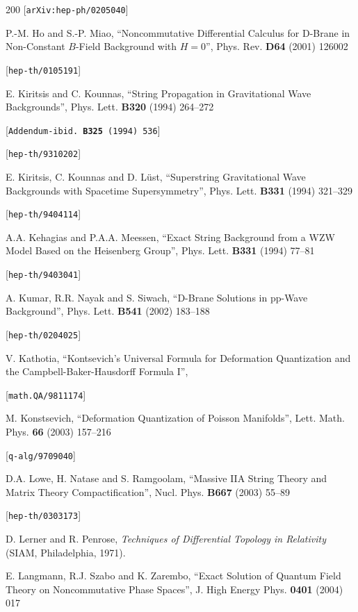 \begin{thebibliography}{200}
 [{\tt arXiv:hep-ph/0205040}] 

 P.-M. Ho and S.-P. Miao, ``Noncommutative Differential Calculus for D-Brane in Non-Constant $B$-Field Background with $H=0$'', Phys. Rev. {\bf D64} (2001) 126002 

 [{\tt hep-th/0105191}] 

 E. Kiritsis and C. Kounnas, ``String Propagation in Gravitational Wave Backgrounds'', Phys. Lett. {\bf B320} (1994) 264--272 

 [{\tt Addendum-ibid. {\bf B325} (1994) 536}] 

 [{\tt hep-th/9310202}] 

 E. Kiritsis, C. Kounnas and D. L\"ust, ``Superstring Gravitational Wave Backgrounds with Spacetime Supersymmetry'', Phys. Lett. {\bf B331} (1994) 321--329 

 [{\tt hep-th/9404114}] 

 A.A. Kehagias and P.A.A. Meessen, ``Exact String Background from a WZW Model Based on the Heisenberg Group'', Phys. Lett. {\bf B331} (1994) 77--81 

 [{\tt hep-th/9403041}] 

 A. Kumar, R.R. Nayak and S. Siwach, ``D-Brane Solutions in pp-Wave Background'', Phys. Lett. {\bf B541} (2002) 183--188 

 [{\tt hep-th/0204025}] 

 V. Kathotia, ``Kontsevich's Universal Formula for Deformation Quantization and the Campbell-Baker-Hausdorff Formula I'', 

 [{\tt math.QA/9811174}] 

 M. Konstsevich, ``Deformation Quantization of Poisson Manifolds'', Lett. Math. Phys. {\bf 66} (2003) 157--216 

 [{\tt q-alg/9709040}] 

 D.A. Lowe, H. Natase and S. Ramgoolam, ``Massive IIA String Theory and Matrix Theory Compactification'', Nucl. Phys. {\bf B667} (2003) 55--89 

 [{\tt hep-th/0303173}] 

 D. Lerner and R. Penrose, {\it Techniques of Differential Topology in Relativity} (SIAM, Philadelphia, 1971). 

 E. Langmann, R.J. Szabo and K. Zarembo, ``Exact Solution of Quantum Field Theory on Noncommutative Phase Spaces'', J. High Energy Phys. {\bf 0401} (2004) 017 


\end{thebibliography}
